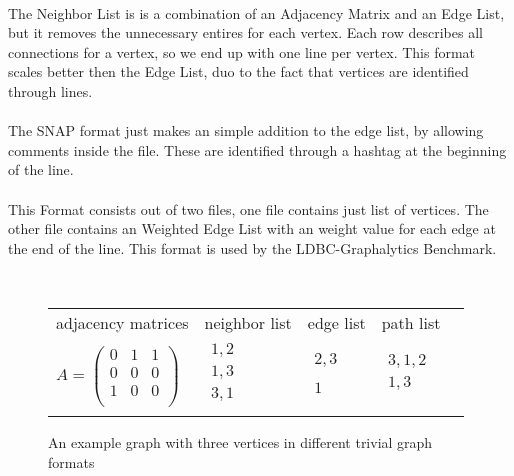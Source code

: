 \\
The Neighbor List is is a combination of an Adjacency Matrix and an Edge List, but it removes the unnecessary entires for each vertex. Each row describes all connections for a vertex, so we end up with one line per vertex. This format scales better then the Edge List, duo to the fact that vertices are identified through lines.\\

\\
The SNAP format just makes an simple addition to the edge list, by allowing comments inside the file. These are identified through a hashtag at the beginning of the line.\\

\\
This Format consists out of two files, one file contains just list of vertices. The other file contains an Weighted Edge List with an weight value for each edge at the end of the line. This format is used by the LDBC-Graphalytics Benchmark.\cite{LDBC-Graphalytics}

\begin{figure}[H]
	\centering
	[Graphic]\\
	\label{simple}
		\setlength{\tabcolsep}{0.5cm} %
		\begin{tabular}{lllll}
			\\
			adjacency matrices & neighbor list & edge list & path list \\
			$A = \left( \begin{array}{rrr}0 & 1 & 1 \\0 & 0 & 0 \\1 & 0 & 0\\\end{array}\right)$ &$\begin{array}{lll}1, 2\\1, 3\\3, 1\\\end{array}$ &$\begin{array}{lll}2,3 \\\\1\\\end{array}$ &$\begin{array}{lll}3,1,2 \\ 1,3 \\\end{array}$ \\
			
		\end{tabular}
	\caption{An example graph with three vertices in different trivial graph formats\cite{Roughan.10.03.2015}}
\end{figure}

